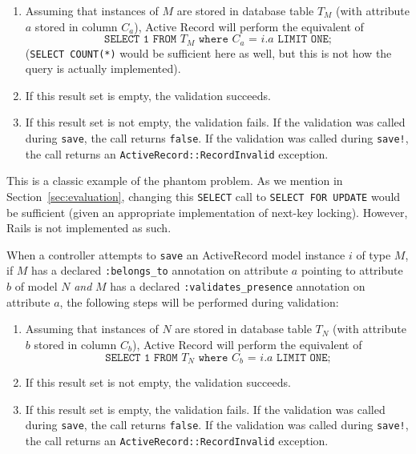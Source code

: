 \begin{enumerate} 

\item Assuming that instances of $M$ are stored in database table $T_M$ (with attribute $a$ stored in column $C_a$), Active Record will perform the equivalent of $$\texttt{SELECT 1 FROM $T_M$ where $C_a$ = $i.a$ LIMIT ONE;}$$ (\texttt{SELECT COUNT(*)} would be sufficient here as well, but this is not how the query is actually implemented).

\item If this result set is empty, the validation succeeds.

\item If this result set is not empty, the validation fails. If the validation was called during \texttt{save}, the call returns \texttt{false}. If the validation was called during \texttt{save!}, the call returns an \texttt{ActiveRecord::RecordInvalid} exception.

\end{enumerate}

This is a classic example of the phantom problem. As we mention in Section~\ref{sec:evaluation}, changing this \texttt{SELECT} call to \texttt{SELECT FOR UPDATE} would be sufficient (given an appropriate implementation of next-key locking). However, Rails is not implemented as such.

 When a controller attempts to \texttt{save} an ActiveRecord model instance $i$ of type $M$, if $M$ has a declared \texttt{:belongs\_to} annotation on attribute $a$ pointing to attribute $b$ of model $N$ \textit{and} $M$ has a declared \texttt{:validates\_presence} annotation on attribute $a$, the following steps will be performed during validation:

\begin{enumerate} 

\item Assuming that instances of $N$ are stored in database table $T_N$ (with attribute $b$ stored in column $C_b$), Active Record will perform the equivalent of $$\texttt{SELECT 1 FROM $T_N$ where $C_b$ = $i.a$ LIMIT ONE;}$$

\item If this result set is not empty, the validation succeeds.

\item If this result set is empty, the validation fails. If the validation was called during \texttt{save}, the call returns \texttt{false}. If the validation was called during \texttt{save!}, the call returns an \texttt{ActiveRecord::RecordInvalid} exception.

\end{enumerate}

